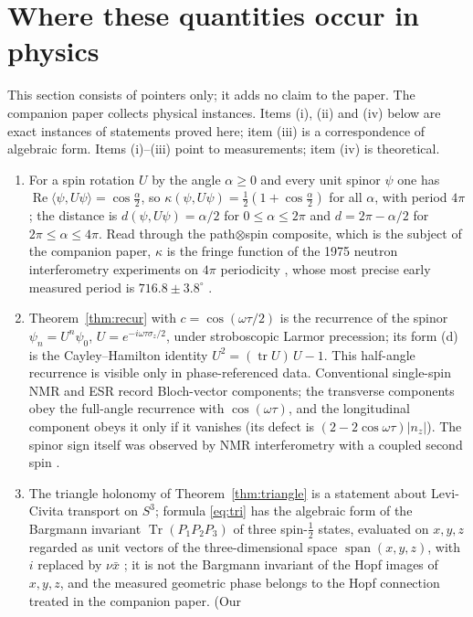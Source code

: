 \documentclass[11pt,reqno]{amsart}
\theoremstyle{definition}
\theoremstyle{remark}
\numberwithin{equation}{section}
\newcommand{\re}{\operatorname{Re}}
\newcommand{\ip}[2]{\langle #1,#2\rangle}
\begin{document}
\section*{Where these quantities occur in physics}
This section consists of pointers only; it adds no claim to the paper.  The companion paper \cite[Physical
examples]{Companion} collects physical instances.  Items (i), (ii) and (iv) below are exact instances of statements proved here; item
(iii) is a correspondence of algebraic form.  Items (i)--(iii) point to measurements; item (iv) is theoretical.
\begin{enumerate}[label=(\roman*),leftmargin=2em]
\item For a spin rotation $U$ by the angle $\alpha\ge0$ and every unit spinor $\psi$ one has $\re\ip\psi{U\psi}=\cos\frac\alpha2$, so
$\kappa(\psi,U\psi)=\tfrac12(1+\cos\frac\alpha2)$ for all $\alpha$, with period $4\pi$; the distance is $d(\psi,U\psi)=\alpha/2$ for $0\le\alpha\le2\pi$ and
$d=2\pi-\alpha/2$ for $2\pi\le\alpha\le4\pi$.  Read through the path$\otimes$spin
composite, which is the subject of the companion paper, $\kappa$ is the fringe function of the 1975 neutron interferometry
experiments on $4\pi$ periodicity \cite{Rauch75,WCOE75}, whose most precise early measured period is $716.8\pm3.8^\circ$
\cite{Rauch78}.
\item Theorem~\ref{thm:recur} with $c=\cos(\omega\tau/2)$ is the recurrence of the spinor $\psi_n=U^n\psi_0$,
$U=e^{-i\omega\tau\sigma_z/2}$, under stroboscopic Larmor precession; its form (d) is the Cayley--Hamilton identity
$U^2=(\operatorname{tr}U)\,U-1$.  This half-angle recurrence is visible only in phase-referenced data.  Conventional single-spin NMR
and ESR record Bloch-vector components; the transverse components obey the full-angle recurrence with $\cos(\omega\tau)$, and the
longitudinal component obeys it only if it vanishes (its defect is $(2-2\cos\omega\tau)\lvert n_z\rvert$).  The spinor sign itself was observed by
NMR interferometry with a coupled second spin \cite{SVV77}.
\item The triangle holonomy of Theorem~\ref{thm:triangle} is a statement about Levi-Civita transport on $S^3$; formula \eqref{eq:tri} has the
algebraic form of the Bargmann invariant $\operatorname{Tr}(P_1P_2P_3)$ of three spin-$\tfrac12$ states, evaluated on $x,y,z$ regarded as unit vectors of
the three-dimensional space $\operatorname{span}(x,y,z)$, with $i$ replaced by $\nu\bar x$ \cite{SB88,MS93}; it is not the Bargmann invariant of the
Hopf images of $x,y,z$, and the measured geometric phase \cite{BS88} belongs to the Hopf connection treated in the companion paper.  (Our

\end{enumerate}
\end{document}

